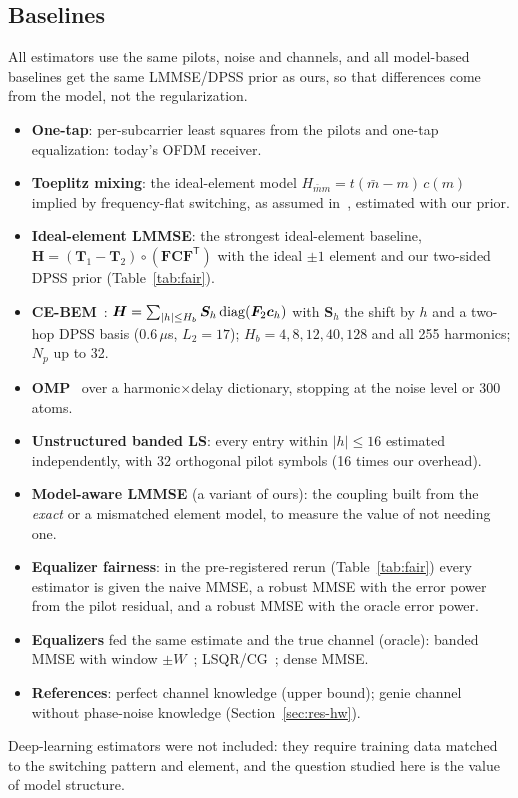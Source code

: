 \subsection{Baselines}
All estimators use the same pilots, noise and channels, and all model-based baselines get
the same LMMSE/DPSS prior as ours, so that differences come from the model, not the
regularization.
\begin{itemize}
\item \textbf{One-tap}: per-subcarrier least squares from the pilots and one-tap
equalization: today's OFDM receiver.
\item \textbf{Toeplitz mixing}: the ideal-element model $H_{\bar mm}=t(\bar m-m)\,c(m)$ implied by
frequency-flat switching, as assumed in~\cite{tao2025secure}, estimated with our prior.
\item \textbf{Ideal-element LMMSE}: the strongest ideal-element baseline, $\bm H=(\bm T_1-\bm T_2)\circ(\bm F\bm C\bm F^{\mathsf T})$
with the ideal $\pm1$ element and our two-sided DPSS prior (Table~\ref{tab:fair}).
\item \textbf{CE-BEM}~\cite{tang2007}: $\bm H=\sum_{|h|\le H_b}\bm S_h\operatorname{diag}(\bm F_2\bm c_h)$ with
$\bm S_h$ the shift by $h$ and a two-hop DPSS basis ($0.6\,\mu$s, $L_2=17$); $H_b=4,8,12,40,128$
and all 255 harmonics; $N_p$ up to 32.
\item \textbf{OMP}~\cite{tropp2007} over a harmonic$\times$delay dictionary, stopping at the noise level or 300 atoms.
\item \textbf{Unstructured banded LS}: every entry within $|h|\le16$ estimated independently, with 32 orthogonal pilot symbols (16 times our overhead).
\item \textbf{Model-aware LMMSE} (a variant of ours): the coupling built from the \emph{exact} or a mismatched element model, to measure the value of not needing one.
\item \textbf{Equalizer fairness}: in the pre-registered rerun (Table~\ref{tab:fair}) every estimator is given the naive
MMSE, a robust MMSE with the error power from the pilot residual, and a robust MMSE with the oracle error power.
\item \textbf{Equalizers} fed the same estimate and the true channel (oracle): banded MMSE with window $\pm W$~\cite{schniter2004,rugini2005}; LSQR/CG~\cite{hrycak2010}; dense MMSE.
\item \textbf{References}: perfect channel knowledge (upper bound); genie channel without phase-noise knowledge (Section~\ref{sec:res-hw}).
\end{itemize}
Deep-learning estimators were not included: they require training data matched to the
switching pattern and element, and the question studied here is the value of model structure.


